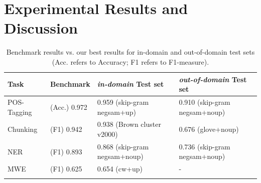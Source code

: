 \section{Experimental Results and Discussion}

\begin{table}
\caption{Benchmark results vs. our best results for in-domain and out-of-domain test sets (Acc. refers to Accuracy; F1 refers to F1-measure).}
\begin{center}
\begin{small}
\begin{tabular}{llll}
\hline
\textbf{Task} & \textbf{Benchmark} & \textbf{\textit{in-domain} Test set} & \textbf{\textit{out-of-domain} Test set} \\ \hline
POS-Tagging & (Acc.) 0.972 \cite{Toutanova:2003} & 0.959 (skip-gram negsam+up) & 0.910 (skip-gram negsam+noup)\\ 
Chunking & (F1) 0.942 \cite{Sha:2003} & 0.938 (Brown cluster v2000) & 0.676 (glove+noup)\\  
NER & (F1) 0.893 \cite{Ando:2005} & 0.868 (skip-gram negsam+noup) & 0.736 (skip-gram negsam+noup) \\  
MWE & (F1) 0.625 \cite{Schneider+:2014} & 0.654 (cw+up) & - \\ 
\hline
\label{benchmark}
\end{tabular}
\end{small}
\end{center}
\end{table}

